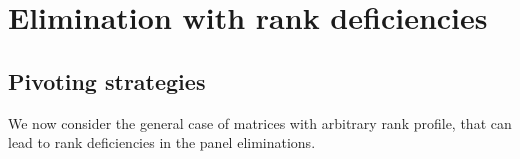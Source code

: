 \documentclass{article}
\begin{document}
 


 
 
 
 
 
 
 
 
 
 
 
 
 
 
 
 
 
 
 

 

 

 

	 
         
         
         
         
         

 
 
 
 

 

  
  
  
  
  
  
  
  
  
  
  
  
  
  
  
  
  
  


 
 

 
 
 
 
 
 
 
 
 
 
 
 
 
 
 
 
 
 
 
 
 
 

 

 
 
\section{Elimination with rank deficiencies}
\label{sec:rankdef}
 
\subsection{Pivoting strategies}
We now consider the general case of matrices with arbitrary rank
profile, that can lead to rank deficiencies in the panel eliminations.
 
\end{document}
